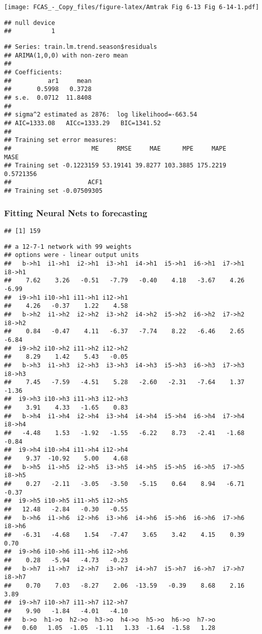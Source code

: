 \documentclass[]{article}
\begin{document}
\texttt{[image: FCAS\_-\_Copy\_files/figure-latex/Amtrak Fig 6-13 Fig 6-14-1.pdf]}

\begin{verbatim}
## null device 
##           1
\end{verbatim}

\begin{verbatim}
## Series: train.lm.trend.season$residuals 
## ARIMA(1,0,0) with non-zero mean 
## 
## Coefficients:
##          ar1     mean
##       0.5998   0.3728
## s.e.  0.0712  11.8408
## 
## sigma^2 estimated as 2876:  log likelihood=-663.54
## AIC=1333.08   AICc=1333.29   BIC=1341.52
## 
## Training set error measures:
##                      ME     RMSE     MAE      MPE     MAPE      MASE
## Training set -0.1223159 53.19141 39.8277 103.3885 175.2219 0.5721356
##                     ACF1
## Training set -0.07509305
\end{verbatim}

\subsubsection{Fitting Neural Nets to
forecasting}\label{fitting-neural-nets-to-forecasting}

\begin{verbatim}
## [1] 159
\end{verbatim}

\begin{verbatim}
## a 12-7-1 network with 99 weights
## options were - linear output units 
##   b->h1  i1->h1  i2->h1  i3->h1  i4->h1  i5->h1  i6->h1  i7->h1  i8->h1 
##    7.62    3.26   -0.51   -7.79   -0.40    4.18   -3.67    4.26   -6.99 
##  i9->h1 i10->h1 i11->h1 i12->h1 
##    4.26   -0.37    1.22    4.58 
##   b->h2  i1->h2  i2->h2  i3->h2  i4->h2  i5->h2  i6->h2  i7->h2  i8->h2 
##    0.84   -0.47    4.11   -6.37   -7.74    8.22   -6.46    2.65   -6.84 
##  i9->h2 i10->h2 i11->h2 i12->h2 
##    8.29    1.42    5.43   -0.05 
##   b->h3  i1->h3  i2->h3  i3->h3  i4->h3  i5->h3  i6->h3  i7->h3  i8->h3 
##    7.45   -7.59   -4.51    5.28   -2.60   -2.31   -7.64    1.37   -1.36 
##  i9->h3 i10->h3 i11->h3 i12->h3 
##    3.91    4.33   -1.65    0.83 
##   b->h4  i1->h4  i2->h4  i3->h4  i4->h4  i5->h4  i6->h4  i7->h4  i8->h4 
##   -4.48    1.53   -1.92   -1.55   -6.22    8.73   -2.41   -1.68   -0.84 
##  i9->h4 i10->h4 i11->h4 i12->h4 
##    9.37  -10.92    5.00    4.68 
##   b->h5  i1->h5  i2->h5  i3->h5  i4->h5  i5->h5  i6->h5  i7->h5  i8->h5 
##    0.27   -2.11   -3.05   -3.50   -5.15    0.64    8.94   -6.71   -0.37 
##  i9->h5 i10->h5 i11->h5 i12->h5 
##   12.48   -2.84   -0.30   -0.55 
##   b->h6  i1->h6  i2->h6  i3->h6  i4->h6  i5->h6  i6->h6  i7->h6  i8->h6 
##   -6.31   -4.68    1.54   -7.47    3.65    3.42    4.15    0.39    0.70 
##  i9->h6 i10->h6 i11->h6 i12->h6 
##    0.28   -5.94   -4.73   -0.23 
##   b->h7  i1->h7  i2->h7  i3->h7  i4->h7  i5->h7  i6->h7  i7->h7  i8->h7 
##    0.70    7.03   -8.27    2.06  -13.59   -0.39    8.68    2.16    3.89 
##  i9->h7 i10->h7 i11->h7 i12->h7 
##    9.90   -1.84   -4.01   -4.10 
##   b->o  h1->o  h2->o  h3->o  h4->o  h5->o  h6->o  h7->o 
##   0.60   1.05  -1.05  -1.11   1.33  -1.64  -1.58   1.28
\end{verbatim}
\end{document}
